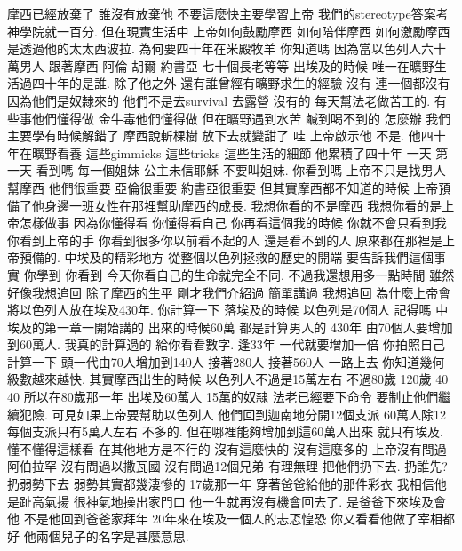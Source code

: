 \documentclass{book}
\begin{document}
摩西已經放棄了 誰沒有放棄他 不要這麼快主要學習上帝 我們的stereotype答案考神學院就一百分.
但在現實生活中 上帝如何鼓勵摩西 如何陪伴摩西 如何激勵摩西 是透過他的太太西波拉.
為何要四十年在米殿牧羊 你知道嗎 因為當以色列人六十萬男人 跟著摩西 阿倫 胡爾 約書亞 七十個長老等等 出埃及的時候 唯一在曠野生活過四十年的是誰.
除了他之外 還有誰曾經有曠野求生的經驗 沒有 連一個都沒有 因為他們是奴隸來的 他們不是去survival 去露營 沒有的 每天幫法老做苦工的.
有些事他們懂得做 金牛毒他們懂得做 但在曠野遇到水苦 鹹到喝不到的 怎麼辦 我們主要學有時候解錯了 摩西說斬棵樹 放下去就變甜了 哇 上帝啟示他 不是.
他四十年在曠野看養 這些gimmicks 這些tricks 這些生活的細節 他累積了四十年 一天 第一天 看到嗎 每一個姐妹 公主未信耶穌 不要叫姐妹.
你看到嗎 上帝不只是找男人幫摩西 他們很重要 亞倫很重要 約書亞很重要 但其實摩西都不知道的時候 上帝預備了他身邊一班女性在那裡幫助摩西的成長.
我想你看的不是摩西 我想你看的是上帝怎樣做事 因為你懂得看 你懂得看自己 你再看這個我的時候 你就不會只看到我 你看到上帝的手 你看到很多你以前看不起的人 還是看不到的人 原來都在那裡是上帝預備的.
中埃及的精彩地方 從整個以色列拯救的歷史的開端 要告訴我們這個事實 你學到 你看到 今天你看自己的生命就完全不同.
不過我還想用多一點時間 雖然好像我想追回 除了摩西的生平 剛才我們介紹過 簡單講過 我想追回 為什麼上帝會將以色列人放在埃及430年.
你計算一下 落埃及的時候 以色列是70個人 記得嗎 中埃及的第一章一開始講的 出來的時候60萬 都是計算男人的 430年 由70個人要增加到60萬人.
我真的計算過的 給你看看數字.
逢33年 一代就要增加一倍 你拍照自己計算一下 頭一代由70人增加到140人 接著280人 接著560人 一路上去 你知道幾何級數越來越快.
其實摩西出生的時候 以色列人不過是15萬左右 不過80歲 120歲 40 40 所以在80歲那一年 出埃及60萬人 15萬的奴隸 法老已經要下命令 要制止他們繼續犯險.
可見如果上帝要幫助以色列人 他們回到迦南地分開12個支派 60萬人除12 每個支派只有5萬人左右 不多的.
但在哪裡能夠增加到這60萬人出來 就只有埃及.
懂不懂得這樣看 在其他地方是不行的 沒有這麼快的 沒有這麼多的 上帝沒有問過阿伯拉罕 沒有問過以撒瓦國 沒有問過12個兄弟 有理無理 把他們扔下去.
扔誰先? 扔弱勢下去 弱勢其實都幾淒慘的 17歲那一年 穿著爸爸給他的那件彩衣 我相信他是趾高氣揚 很神氣地操出家門口 他一生就再沒有機會回去了.
是爸爸下來埃及會他 不是他回到爸爸家拜年 20年來在埃及一個人的忐忑惶恐 你又看看他做了宰相都好 他兩個兒子的名字是甚麼意思.
\end{document}
